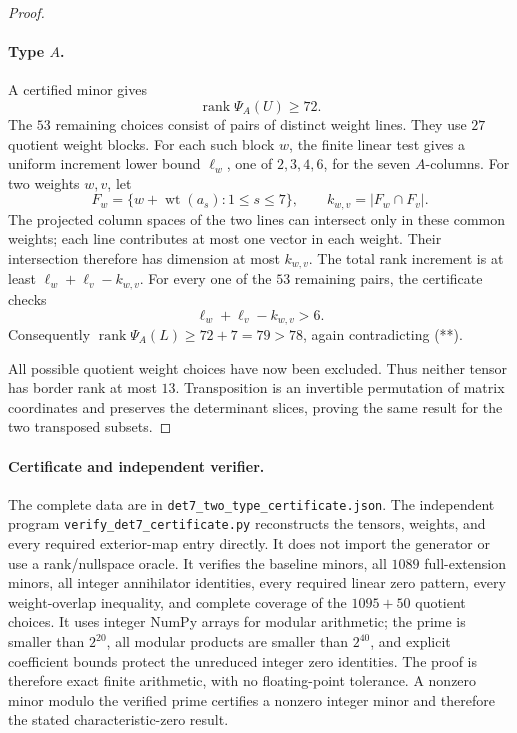 \begin{proof}
\paragraph{Type \(A\).}
A certified minor gives
\[
 \operatorname{rank}\Psi_A(U)\geq72.
\]
The \(53\) remaining choices consist of pairs of distinct
weight lines. They use \(27\) quotient weight blocks.
For each such block \(w\), the finite linear test gives
a uniform increment lower bound \(\ell_w\), one of
\(2,3,4,6\), for the seven \(A\)-columns.
For two weights \(w,v\), let
\[
 F_w=\{w+\operatorname{wt}(a_s):1\leq s\leq7\},
 \qquad k_{w,v}=|F_w\cap F_v|.
\]
The projected column spaces of the two lines can intersect
only in these common weights; each line contributes at
most one vector in each weight. Their intersection
therefore has dimension at most \(k_{w,v}\).
The total rank increment is at least
\(\ell_w+\ell_v-k_{w,v}\).
For every one of the \(53\) remaining pairs, the certificate
checks
\[
 \ell_w+\ell_v-k_{w,v}>6.
\]
Consequently
\(\operatorname{rank}\Psi_A(L)\geq72+7=79>78\),
again contradicting (**).

All possible quotient weight choices have now been excluded.
Thus neither tensor has border rank at most \(13\).
Transposition is an invertible permutation of matrix
coordinates and preserves the determinant slices, proving
the same result for the two transposed subsets.
\end{proof}

\paragraph{Certificate and independent verifier.}
The complete data are in
\texttt{det7\_two\_type\_certificate.json}.
The independent program
\texttt{verify\_det7\_certificate.py} reconstructs the
tensors, weights, and every required exterior-map entry
directly. It does not import the generator or use a
rank/nullspace oracle. It verifies the baseline minors,
all \(1089\) full-extension minors, all integer annihilator
identities, every required linear zero pattern, every
weight-overlap inequality, and complete coverage of the
\(1095+50\) quotient choices.
It uses integer NumPy arrays for modular arithmetic;
the prime is smaller than \(2^{20}\), all modular products
are smaller than \(2^{40}\), and explicit coefficient
bounds protect the unreduced integer zero identities.
The proof is therefore exact finite arithmetic, with no
floating-point tolerance. A nonzero minor modulo the
verified prime certifies a nonzero integer minor and
therefore the stated characteristic-zero result.

